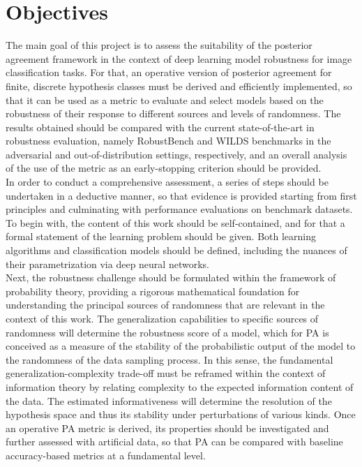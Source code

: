\section{Objectives}

The main goal of this project is to assess
the suitability of the posterior agreement framework in the 
context of deep learning model robustness for image 
classification tasks. For that, an operative version of posterior
agreement for finite, discrete hypothesis classes must be derived and
efficiently implemented, so that it can be used as a metric to evaluate 
and select models based on the robustness of their response to different 
sources and levels of randomness. The results obtained should be compared
with the current state-of-the-art in robustness evaluation, namely
RobustBench
\cite{croceRobustBenchStandardizedAdversarial2021a}
and WILDS 
\cite{kohWILDSBenchmarkIntheWild2021}
benchmarks in the adversarial and
out-of-distribution settings, respectively, and an overall
analysis of the use of the metric as an early-stopping 
criterion should be provided.\\

In order to conduct a comprehensive assessment, a series of steps should be undertaken in a 
deductive manner, so that evidence is provided starting from first principles and culminating
with performance evaluations on benchmark datasets. To begin with, the content of this work should
be self-contained, and for that a formal statement of the learning problem should be given. Both 
learning algorithms and classification models should be defined, including the nuances of their
parametrization via deep neural networks. \\

Next, the robustness challenge should be formulated within the framework of probability theory,
providing a rigorous mathematical foundation for understanding the principal sources of randomness that
are relevant in the context of this work. The generalization capabilities to specific sources of randomness
will determine the robustness score of a model, which for PA is conceived as a 
measure of the stability of the probabilistic output of the model to the randomness of the data 
sampling process. In this sense, the fundamental generalization-complexity trade-off must be reframed
within the context of information theory by relating complexity to the expected information content
of the data. The estimated informativeness will determine the resolution of the hypothesis space and
thus its stability under perturbations of various kinds. Once an operative PA metric is derived, 
its properties should be investigated and further assessed with artificial data, so that PA can be compared 
with baseline accuracy-based metrics at a fundamental level. \\

